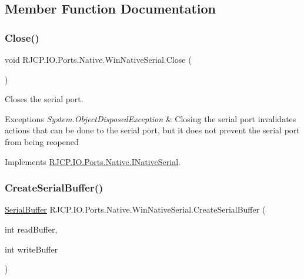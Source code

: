 \subsection{Member Function Documentation}
\mbox{\label{class_r_j_c_p_1_1_i_o_1_1_ports_1_1_native_1_1_win_native_serial_a4bd7bf6de34d7d8f70a4d245a00ffa77}} 
\subsubsection{\texorpdfstring{Close()}{Close()}}
{\footnotesize\ttfamily void R\+J\+C\+P.\+I\+O.\+Ports.\+Native.\+Win\+Native\+Serial.\+Close (\begin{DoxyParamCaption}{ }\end{DoxyParamCaption})}



Closes the serial port. 


\begin{DoxyExceptions}{Exceptions}
{\em System.\+Object\+Disposed\+Exception} & Closing the serial port invalidates actions that can be done to the serial port, but it does not prevent the serial port from being reopened \\
\hline
\end{DoxyExceptions}


Implements \mbox{\hyperlink{interface_r_j_c_p_1_1_i_o_1_1_ports_1_1_native_1_1_i_native_serial_adb88604917c61a951ee180962aa81ce1}{R\+J\+C\+P.\+I\+O.\+Ports.\+Native.\+I\+Native\+Serial}}.

\mbox{\label{class_r_j_c_p_1_1_i_o_1_1_ports_1_1_native_1_1_win_native_serial_ad36215a4957349cba6078c7196dc6db3}} 
\subsubsection{\texorpdfstring{CreateSerialBuffer()}{CreateSerialBuffer()}}
{\footnotesize\ttfamily \mbox{\hyperlink{class_r_j_c_p_1_1_i_o_1_1_ports_1_1_native_1_1_serial_buffer}{Serial\+Buffer}} R\+J\+C\+P.\+I\+O.\+Ports.\+Native.\+Win\+Native\+Serial.\+Create\+Serial\+Buffer (\begin{DoxyParamCaption}\item[{int}]{read\+Buffer,  }\item[{int}]{write\+Buffer }\end{DoxyParamCaption})}



